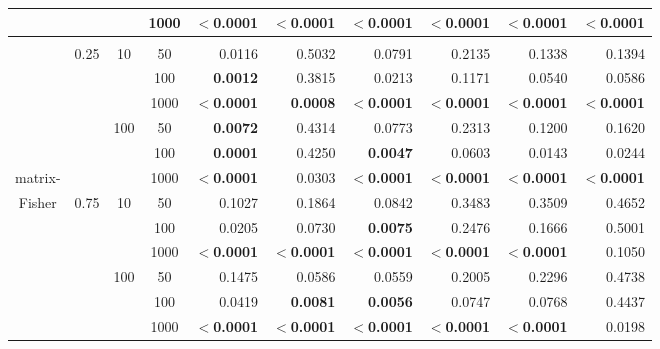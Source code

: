 \documentclass[12pt]{article}
\begin{document}
\begin{table}[h!]
\begin{center}
{\begin{tabular}{ccccrrrrrr}
  &  &  & 1000 & $<$\textbf{0.0001} & $<$\textbf{0.0001} & $<$\textbf{0.0001} & $<$\textbf{0.0001} & $<$\textbf{0.0001} & $<$\textbf{0.0001} \\[5pt] \hline\\[-4pt]
  & \multirow{6}{*}{0.25} & \multirow{3}{*}{10} & 50 & 0.0116 & 0.5032 & 0.0791 & 0.2135 & 0.1338 & 0.1394 \\ 
  &  &  & 100 & \textbf{0.0012} & 0.3815 & 0.0213 & 0.1171 & 0.0540 & 0.0586 \\ 
  &  &  & 1000 & $<$\textbf{0.0001} & \textbf{0.0008} & $<$\textbf{0.0001} & $<$\textbf{0.0001} & $<$\textbf{0.0001} & $<$\textbf{0.0001} \\ \cline{3-10}
  &  & \multirow{3}{*}{100} & 50 & \textbf{0.0072} & 0.4314 & 0.0773 & 0.2313 & 0.1200 & 0.1620 \\ 
  &  &  & 100 & \textbf{0.0001} & 0.4250 & \textbf{0.0047} & 0.0603 & 0.0143 & 0.0244 \\ 
  matrix-&  &  & 1000 & $<$\textbf{0.0001} & 0.0303 & $<$\textbf{0.0001} & $<$\textbf{0.0001} & $<$\textbf{0.0001} & $<$\textbf{0.0001} \\ \cline{2-10}
  Fisher& \multirow{6}{*}{0.75} & \multirow{3}{*}{10} & 50 & 0.1027 & 0.1864 & 0.0842 & 0.3483 & 0.3509 & 0.4652 \\ 
  &  &  & 100 & 0.0205 & 0.0730 &\textbf{0.0075} & 0.2476 & 0.1666 & 0.5001 \\ 
  &  &  & 1000 & $<$\textbf{0.0001} & $<$\textbf{0.0001} & $<$\textbf{0.0001} & $<$\textbf{0.0001} & $<$\textbf{0.0001} & 0.1050 \\ \cline{3-10}
  &  & \multirow{3}{*}{100} & 50 & 0.1475 & 0.0586 & 0.0559 & 0.2005 & 0.2296 & 0.4738 \\ 
  &  &  & 100 & 0.0419 & \textbf{0.0081} & \textbf{0.0056} & 0.0747 & 0.0768 & 0.4437 \\ 
  &  &  & 1000 & $<$\textbf{0.0001} & $<$\textbf{0.0001} & $<$\textbf{0.0001} & $<$\textbf{0.0001} & $<$\textbf{0.0001} & 0.0198 \\ 
   \hline
\end{tabular}}
\end{center}
\end{table}
\end{document}
